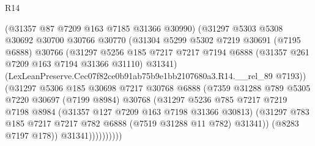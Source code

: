 \begin{lexlean}{R14}
\begin{coremodule}
                            (@31357 @87 @7209 @163 @7185 @31366 @30990)
                            (@31297
                              @5303
                              @5308
                              @30692
                              @30700
                              @30766
                              @30770
                              (@31304
                                @5299
                                @5302
                                @7219
                                @30691
                                (@7195 @6888)
                                @30766
                                (@31297
                                  @5256
                                  @185
                                  @7217
                                  @7217
                                  @7194
                                  @6888
                                  (@31357 @261 @7209 @163 @7194 @31366 @31110)
                                  @31341)
                                (LexLeanPreserve.Cec07f82ce0b91ab75b9e1bb2107680a3.R14.__rel_89
                                  @7193))
                              (@31297
                                @5306
                                @185
                                @30698
                                @7217
                                @30768
                                @6888
                                (@7359
                                  @31288
                                  @789
                                  @5305
                                  @7220
                                  @30697
                                  (@7199 @8984)
                                  @30768
                                  (@31297
                                    @5236
                                    @785
                                    @7217
                                    @7219
                                    @7198
                                    @8984
                                    (@31357 @127 @7209 @163 @7198 @31366 @30813)
                                    (@31297
                                      @783
                                      @185
                                      @7217
                                      @7217
                                      @782
                                      @6888
                                      (@7519 @31288 @11 @782)
                                      @31341))
                                  (@8283 @7197 @178))
                                @31341))))))))))

\end{coremodule}
\end{lexlean}
